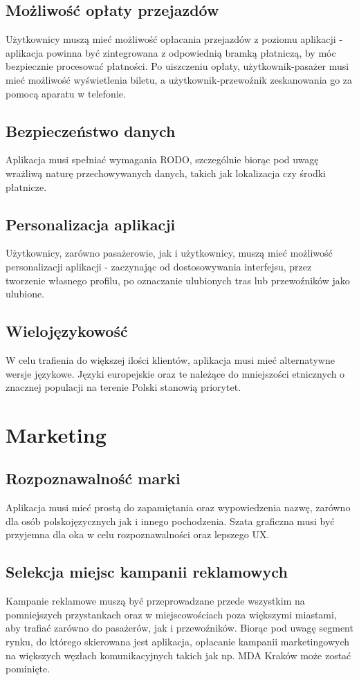 \subsection{Możliwość opłaty przejazdów}
Użytkownicy muszą mieć możliwość opłacania przejazdów z poziomu aplikacji - aplikacja powinna być zintegrowana z odpowiednią bramką płatniczą, by móc bezpiecznie procesować płatności. Po uiszczeniu opłaty, użytkownik-pasażer musi mieć możliwość wyświetlenia biletu, a użytkownik-przewoźnik zeskanowania go za pomocą aparatu w telefonie.

\subsection{Bezpieczeństwo danych}
Aplikacja musi spełniać wymagania RODO, szczególnie biorąc pod uwagę wrażliwą naturę przechowywanych danych, takich jak lokalizacja czy środki płatnicze.

\subsection{Personalizacja aplikacji}
Użytkownicy, zarówno pasażerowie, jak i użytkownicy, muszą mieć możliwość personalizacji aplikacji - zaczynając od dostosowywania interfejsu, przez tworzenie własnego profilu, po oznaczanie ulubionych tras lub przewoźników jako ulubione.

\subsection{Wielojęzykowość}
W celu trafienia do większej ilości klientów, aplikacja musi mieć alternatywne wersje językowe. Języki europejskie oraz te należące do mniejszości etnicznych o znacznej populacji na terenie Polski stanowią priorytet.

\section{Marketing}
\subsection{Rozpoznawalność marki}
Aplikacja musi mieć prostą do zapamiętania oraz wypowiedzenia nazwę, zarówno dla osób polskojęzycznych jak i innego pochodzenia. Szata graficzna musi być przyjemna dla oka w celu rozpoznawalności oraz lepszego UX.

\subsection{Selekcja miejsc kampanii reklamowych}
Kampanie reklamowe muszą być przeprowadzane przede wszystkim na pomniejszych przystankach oraz w miejscowościach poza większymi miastami, aby trafiać zarówno do pasażerów, jak i przewoźników. Biorąc pod uwagę segment rynku, do którego skierowana jest aplikacja, opłacanie kampanii marketingowych na większych węzłach komunikacyjnych takich jak np. MDA Kraków może zostać pominięte.


